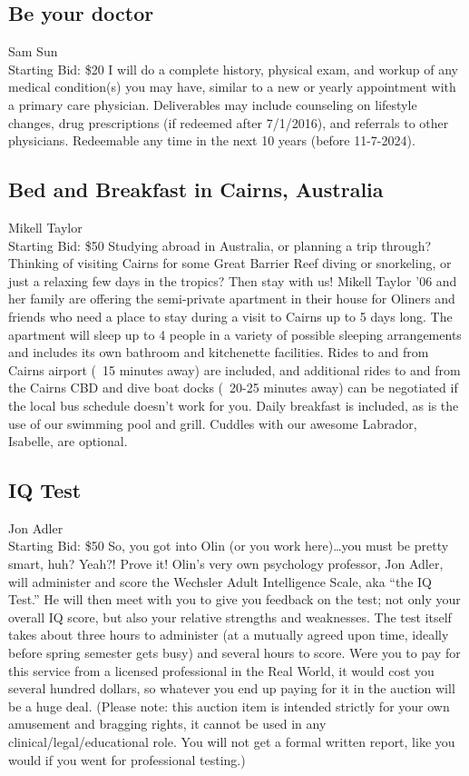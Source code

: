 \documentclass[11pt]{article}
\begin{document}
\subsection{Be your doctor}
Sam Sun
\\
Starting Bid: \$20
\newline
I will do a complete history, physical exam, and workup of any medical condition(s) you may have, similar to a new or yearly appointment with a primary care physician.  Deliverables may include counseling on lifestyle changes, drug prescriptions (if redeemed after 7/1/2016), and referrals to other physicians. Redeemable any time in the next 10 years (before 11-7-2024).
\subsection{Bed and Breakfast in Cairns, Australia}
Mikell Taylor
\\
Starting Bid: \$50
\newline
Studying abroad in Australia, or planning a trip through? Thinking of visiting Cairns for some Great Barrier Reef diving or snorkeling, or just a relaxing few days in the tropics? Then stay with us! Mikell Taylor '06 and her family are offering the semi-private apartment in their house for Oliners and friends who need a place to stay during a visit to Cairns up to 5 days long. The apartment will sleep up to 4 people in a variety of possible sleeping arrangements and includes its own bathroom and kitchenette facilities. Rides to and from Cairns airport (~15 minutes away) are included, and additional rides to and from the Cairns CBD and dive boat docks (~20-25 minutes away) can be negotiated if the local bus schedule doesn't work for you. Daily breakfast is included, as is the use of our swimming pool and grill. Cuddles with our awesome Labrador, Isabelle, are optional.
\subsection{IQ Test}
Jon Adler
\\
Starting Bid: \$50
\newline
So, you got into Olin (or you work here)…you must be pretty smart, huh?  Yeah?!  Prove it!  Olin’s very own psychology professor, Jon Adler, will administer and score the Wechsler Adult Intelligence Scale, aka “the IQ Test.”  He will then meet with you to give you feedback on the test; not only your overall IQ score, but also your relative strengths and weaknesses.  The test itself takes about three hours to administer (at a mutually agreed upon time, ideally before spring semester gets busy) and several hours to score.  Were you to pay for this service from a licensed professional in the Real World, it would cost you several hundred dollars, so whatever you end up paying for it in the auction will be a huge deal.  (Please note: this auction item is intended strictly for your own amusement and bragging rights, it cannot be used in any clinical/legal/educational role.  You will not get a formal written report, like you would if you went for professional testing.)
\end{document}
